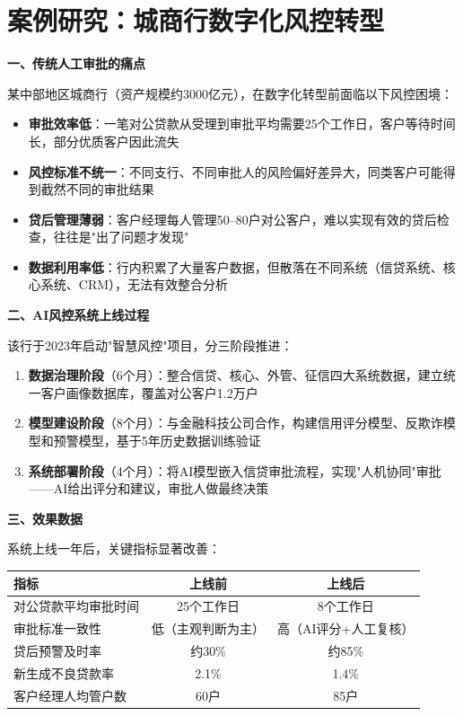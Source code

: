 \section{案例研究：城商行数字化风控转型}

\begin{casebox}[某城商行的风控升级之路]

\textbf{一、传统人工审批的痛点}

某中部地区城商行（资产规模约3000亿元），在数字化转型前面临以下风控困境：

\begin{itemize}[leftmargin=2em]
  \item \textbf{审批效率低}：一笔对公贷款从受理到审批平均需要25个工作日，客户等待时间长，部分优质客户因此流失
  \item \textbf{风控标准不统一}：不同支行、不同审批人的风险偏好差异大，同类客户可能得到截然不同的审批结果
  \item \textbf{贷后管理薄弱}：客户经理每人管理50--80户对公客户，难以实现有效的贷后检查，往往是"出了问题才发现"
  \item \textbf{数据利用率低}：行内积累了大量客户数据，但散落在不同系统（信贷系统、核心系统、CRM），无法有效整合分析
\end{itemize}

\textbf{二、AI风控系统上线过程}

该行于2023年启动"智慧风控"项目，分三阶段推进：

\begin{enumerate}[leftmargin=2em]
  \item \textbf{数据治理阶段}（6个月）：整合信贷、核心、外管、征信四大系统数据，建立统一客户画像数据库，覆盖对公客户1.2万户
  \item \textbf{模型建设阶段}（8个月）：与金融科技公司合作，构建信用评分模型、反欺诈模型和预警模型，基于5年历史数据训练验证
  \item \textbf{系统部署阶段}（4个月）：将AI模型嵌入信贷审批流程，实现"人机协同"审批——AI给出评分和建议，审批人做最终决策
\end{enumerate}

\textbf{三、效果数据}

系统上线一年后，关键指标显著改善：

\begin{table}[H]
\centering
\begin{tabular}{lcc}
\toprule
\textbf{指标} & \textbf{上线前} & \textbf{上线后} \\
\midrule
对公贷款平均审批时间 & 25个工作日 & 8个工作日 \\
审批标准一致性 & 低（主观判断为主） & 高（AI评分+人工复核） \\
贷后预警及时率 & 约30\% & 约85\% \\
新生成不良贷款率 & 2.1\% & 1.4\% \\
客户经理人均管户数 & 60户 & 85户 \\
\end{tabular}
\end{table}


\end{casebox}

